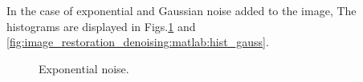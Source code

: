 In the case of exponential and Gaussian noise added to the image, The histograms are displayed in Figs.\ref{fig:image_restoration_denoising:matlab:hist_exp} and \ref{fig:image_restoration_denoising:matlab:hist_gauss}.

\begin{figure}[htbp]
 \centering
 \hfill

  \caption{Exponential noise.}
  \label{fig:image_restoration_denoising:matlab:hist_exp}
\end{figure}

